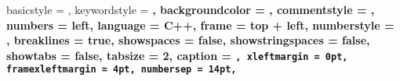 \renewcommand{\maketitle}
{
	
	\thispagestyle{empty}
	\pagenumbering{roman}
}

\newcommand{\mytableofcontents}
{
	\renewcommand{\contentsname}{Table of Contents}
	\tableofcontents
}

\newcommand{\mylistoffigures}
{
	\listoffigures
	\addcontentsline{toc}{chapter}{List of Figures}
}

\newcommand{\myglossaries}
{
	\glstoctrue
	\printglossaries
}

\newcommand{\mylistoftables}
{
	\listoftables
	\addcontentsline{toc}{chapter}{List of Tables}
}

\lstset
{
	basicstyle = \fontsize{7pt}{7}\ttfamily,
	keywordstyle = \color{black}\bfseries,
	backgroundcolor = \color{gray95},
	commentstyle = \color{gray50},
	numbers = left,
	language = C++,
	frame = top + left,
	numberstyle = \tiny,
	breaklines = true,
	showspaces = false,
	showstringspaces = false,
	showtabs = false,
	tabsize = 2,
	caption = \tt\lstname,
	xleftmargin = 0pt,
	framexleftmargin = 4pt,
	numbersep = 14pt,
}

\newcommand{\illst}{\lstinline[basicstyle = \ttfamily]}  % prevent small size of inline listing


\renewcommand{\labelitemi}{$ \circ $}  %
\renewcommand{\labelitemii}{$ \cdot $}  %
